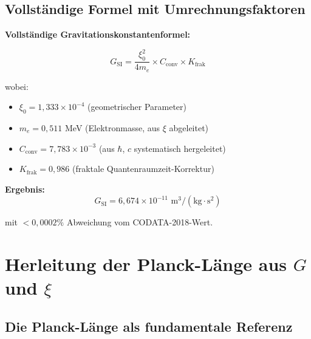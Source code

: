 \documentclass[12pt,a4paper]{article}
\begin{document}
	\subsection{Vollst{\"a}ndige Formel mit Umrechnungsfaktoren}
	
	\begin{keyresult}
		\textbf{Vollst{\"a}ndige Gravitationskonstantenformel:}
		
		\begin{equation}
			\boxed{G_{\text{SI}} = \frac{\xi_0^2}{4 m_e} \times C_{\text{conv}} \times K_{\text{frak}}}
			\label{eq:G_complete}
		\end{equation}
		
		wobei:
		\begin{itemize}
			\item $\xi_0 = 1{,}333 \times 10^{-4}$ (geometrischer Parameter)
			\item $m_e = 0{,}511$ MeV (Elektronmasse, aus $\xi$ abgeleitet)
			\item $C_{\text{conv}} = 7{,}783 \times 10^{-3}$ (aus $\hbar$, $c$ systematisch hergeleitet)
			\item $K_{\text{frak}} = 0{,}986$ (fraktale Quantenraumzeit-Korrektur)
		\end{itemize}
		
		\textbf{Ergebnis:}
		\begin{equation}
			G_{\text{SI}} = 6{,}674 \times 10^{-11} \text{ m}^3/(\text{kg}\cdot\text{s}^2)
		\end{equation}
		
		mit $<0{,}0002\%$ Abweichung vom CODATA-2018-Wert.
	\end{keyresult}
	
	\section{Herleitung der Planck-L{\"a}nge aus $G$ und $\xi$}
	
	\subsection{Die Planck-L{\"a}nge als fundamentale Referenz}
	
\end{document}
